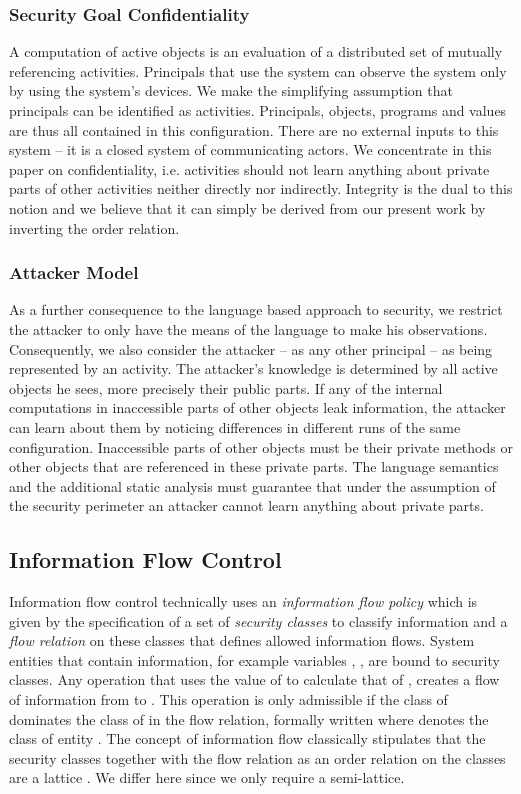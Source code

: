 \documentclass[10pt, conference, compsocconf]{IEEEtran}
\begin{document}
{\subsubsection*{Security Goal Confidentiality}
A computation of active objects is an evaluation of a distributed set of mutually referencing
activities. Principals that use the system can observe the system only by using the system's
devices. We make the simplifying assumption that principals can be identified as activities.
Principals, objects, programs and values are thus all contained in this configuration.
There are no external inputs to this system -- it is a closed system of communicating actors.
We concentrate in this paper on confidentiality, i.e. activities should not learn anything
about private parts of other activities neither directly nor indirectly.
Integrity is the dual to this notion and we believe that it can simply be derived from our present
work by inverting the order relation.

\subsubsection*{Attacker Model}
As a further consequence to the language based approach to security, we restrict the attacker to only have
the means of the language to make his observations.
Consequently, we also consider the attacker -- as any other principal -- as being represented 
by an activity. The attacker's knowledge is determined by all active objects he sees, 
more precisely their public parts. If any of the internal computations in inaccessible parts of other objects leak information,
the attacker can learn about them by noticing differences in different runs of the same
configuration. 
Inaccessible parts of other objects must be their private methods
or other objects 
that are referenced in these private 
parts.
The language semantics and the additional static analysis must guarantee that under the
assumption of the security perimeter an attacker cannot learn anything about private parts.


\subsection{Information Flow Control}
\label{sec:ifcao}
Information flow control \cite{dd:77} technically uses an {\it information flow policy} 
which is given by the specification of a set of {\it security classes} to classify 
information and a {\it flow relation} on these classes that defines 
allowed information flows. System entities that contain information, for example variables , ,
are bound to security classes. Any operation that uses the value of  to calculate that of , creates a flow of information from  to .
This operation is only admissible if the class of  dominates the class of  in the flow relation,
formally written  where  denotes the class of entity .
The concept of information flow classically stipulates that the security classes together with 
the flow relation as an order relation on the classes are a lattice \cite{de:76,dp:02}. We differ here
since we only require a semi-lattice.

}
\end{document}

